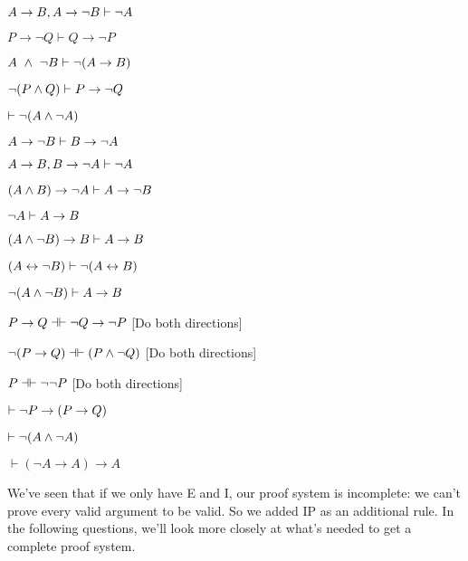 \begin{earg}
\item $A\rightarrow B, A \rightarrow \neg B \vdash \neg A$
\item $P \rightarrow \lnot Q \vdash Q \rightarrow \lnot P$
\item $A \ \wedge  \ \neg B \vdash \neg (A \rightarrow B)$ %
\item $\neg (P\wedge  Q) \vdash P\rightarrow \neg Q$
\item $ \vdash \neg (A\wedge  \neg A)$
\item $A \rightarrow \neg B \vdash B \rightarrow \neg A$
\item $A \rightarrow B, B \rightarrow \neg A \vdash \neg A$
\item $(A \wedge B) \rightarrow \neg A \vdash A \rightarrow \neg B$
\item $\neg A \vdash A \rightarrow B$
\item $(A \wedge \neg B) \rightarrow B \vdash A \rightarrow B$
\item $(A\leftrightarrow \neg B) \vdash \neg (A\leftrightarrow B)$
\item $\neg (A\wedge \neg B) \vdash A \rightarrow B$
\item $P \eif Q \pequiv \enot Q \eif \enot P$ \hfill [Do both directions]
\item $\enot (P \eif Q) \pequiv (P \eand \enot Q)$ \hfill [Do both directions]
\item $P \pequiv \enot \enot P$ \hfill [Do both directions]
\item $\vdash \neg P \rightarrow( P \rightarrow Q)$
\item $\vdash \neg (A \wedge \neg A)$
\item $\vdash (\lnot A \rightarrow A) \rightarrow A$
\end{earg}

\problempart\label{ex-neg-prf}We've seen that if we only have \enot E and \enot I, our proof system is incomplete: we can't prove every valid argument to be valid. So we added IP as an additional rule.  In the following questions, we'll look more closely at what's needed to get a complete proof system.


